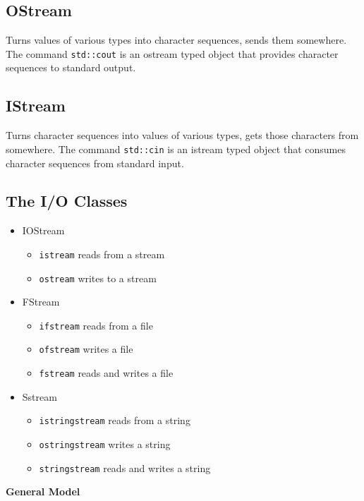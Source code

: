 \documentclass{article}
\begin{document}
	\subsection{OStream}
	
	Turns values of various types into character sequences, sends them somewhere. The command \verb|std::cout| is an ostream typed object that provides character sequences to standard output.
	
	\subsection{IStream}
	
	Turns character sequences into values of various types, gets those characters from somewhere. The command \verb|std::cin| is an istream typed object that consumes character sequences from standard input.
	
	\subsection{The I/O Classes}
	
	 \begin{itemize}
	 	\item IOStream
	 		\begin{itemize}
	 			\item \verb|istream| reads from a stream
	 			\item \verb|ostream| writes to a stream
	 		\end{itemize}
 		\item FStream
 			\begin{itemize}
 				\item \verb|ifstream| reads from a file
 				\item \verb|ofstream| writes a file
 				\item \verb|fstream| reads and writes a file
 			\end{itemize}
 		\item Sstream
 			\begin{itemize}
 				\item \verb|istringstream| reads from a string
 				\item \verb|ostringstream| writes a string
 				\item \verb|stringstream| reads and writes a string
 			\end{itemize}
	 \end{itemize}
 
 	\textbf{General Model}
 	
\end{document}
